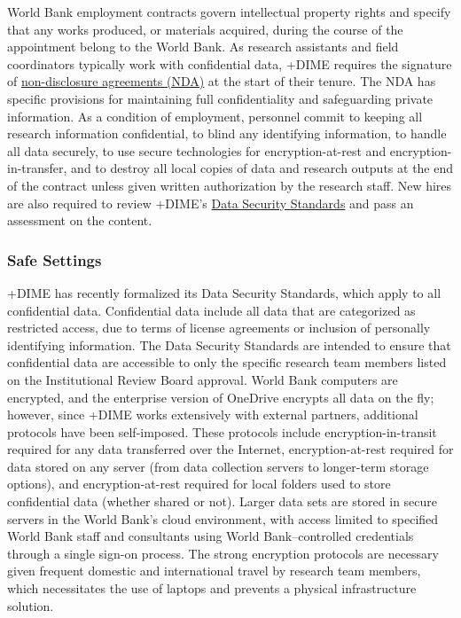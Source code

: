 \documentclass[
]{WileySix}
\begin{document}
World Bank employment contracts govern intellectual property rights and specify that any works produced, or materials acquired, during the course of the appointment belong to the World Bank. As research assistants and field coordinators typically work with confidential data, +DIME\textbar{} requires the signature of \href{https://github.com/worldbank/dime-standards/blob/master/dime-research-standards/pillar-4-data-security/data-security-resources/dime-data-nda-mou.md}{non-disclosure agreements (NDA)} at the start of their tenure. The NDA has specific provisions for maintaining full confidentiality and safeguarding private information. As a condition of employment, personnel commit to keeping all research information confidential, to blind any identifying information, to handle all data securely, to use secure technologies for encryption-at-rest and encryption-in-transfer, and to destroy all local copies of data and research outputs at the end of the contract unless given written authorization by the research staff. New hires are also required to review +DIME\textbar's \href{https://github.com/worldbank/dime-standards/tree/master/dime-research-standards/pillar-4-data-security}{Data Security Standards} and pass an assessment on the content.

\hypertarget{safe-settings-7}{%
\subsubsection{Safe Settings}\label{safe-settings-7}}

+DIME\textbar{} has recently formalized its Data Security Standards, which apply to all confidential data. Confidential data include all data that are categorized as restricted access, due to terms of license agreements or inclusion of personally identifying information. The Data Security Standards are intended to ensure that confidential data are accessible to only the specific research team members listed on the Institutional Review Board approval. World Bank computers are encrypted, and the enterprise version of OneDrive encrypts all data on the fly; however, since +DIME\textbar{} works extensively with external partners, additional protocols have been self-imposed. These protocols include encryption-in-transit required for any data transferred over the Internet, encryption-at-rest required for data stored on any server (from data collection servers to longer-term storage options), and encryption-at-rest required for local folders used to store confidential data (whether shared or not). Larger data sets are stored in secure servers in the World Bank's cloud environment, with access limited to specified World Bank staff and consultants using World Bank--controlled credentials through a single sign-on process. The strong encryption protocols are necessary given frequent domestic and international travel by research team members, which necessitates the use of laptops and prevents a physical infrastructure solution.
\end{document}
